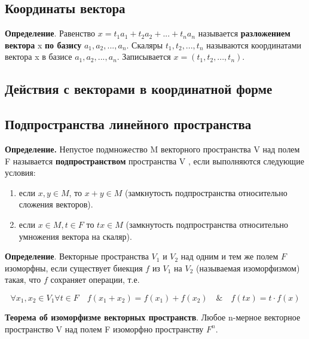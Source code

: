 \documentclass[a4paper]{article}
\begin{document}
    \subsection*{Координаты вектора}
    \textbf{Определение}. Равенство $x = t_1a_1 + t_2a_2 + ... + t_na_n$ называется \textbf{разложением вектора }
    x \textbf{по базису} $a_1, a_2, ..., a_n$. Скаляры $t_1, t_2, ..., t_n$ называются координатами вектора x в базисе $a_1, a_2, ..., a_n$. Записывается $x = (t_1, t_2, ..., t_n)$.

    \subsection*{Действия с векторами в координатной форме}


    \newpage \begin{center}
                 \begin{Large}
                 \end{Large}
    \end{center}
    \subsection*{Подпространства линейного пространства}
    \textbf{Определение.} Непустое подмножество M векторного пространства V над полем F
    называется \textbf{подпространством} пространства V , если выполняются
    следующие условия:
    \begin{enumerate}
        \item если $x,y \in M$, то $x+y \in M$ (замкнутость подпространства относительно сложения векторов).
        \item если $x \in M, t \in F$ то $tx \in M$ (замкнутость подпространства относительно умножения вектора на скаляр).
    \end{enumerate}


    \textbf{Определение}. Векторные пространства $V_1$ и $V_2$ над одним и тем же полем $F$ изоморфны, если существует биекция $f$ из $V_1$ на $V_2$ (называемая изоморфизмом) такая, что $f$ сохраняет операции, т.е.

    \begin{equation}
        \forall x_1, x_2 \in V_1 \forall t \in F \quad f(x_1+x_2) = f(x_1) + f(x_2) \quad \& \quad f(tx) = t \cdot f(x)
    \end{equation}

    \begin{htheorem}
        \textbf{Теорема об изоморфизме векторных пространств}. Любое n-мерное векторное пространство V над полем F изоморфно
        пространству $F^n$.
    \end{htheorem}
\end{document}
